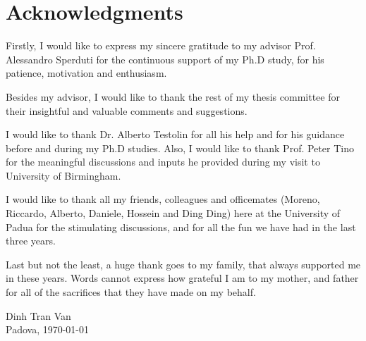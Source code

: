 \chapter*{Acknowledgments}
Firstly, I would like to express my sincere gratitude to my advisor Prof. Alessandro Sperduti for the continuous support of my Ph.D study, for his patience, motivation and enthusiasm.


Besides my advisor, I would like to thank the rest of my thesis committee for their insightful and valuable comments and suggestions.


I would like to thank Dr. Alberto Testolin for all his help and for his guidance before and during my Ph.D studies.  Also, I would like to thank Prof. Peter Tino for the meaningful discussions and inputs he provided during my visit to University of Birmingham.


I would like to thank all my friends, colleagues and officemates (Moreno, Riccardo, Alberto, Daniele, Hossein and Ding Ding) here at the University of Padua for the stimulating discussions, and for all the fun we have had in the last three years.


Last but not the least, a huge thank goes to my family, that always supported me in these years. Words cannot express how grateful I am to my mother, and father for all of the sacrifices that they have made on my behalf.
\vspace{2cm}
\begin{flushright}
Dinh Tran Van~~~~~\\
Padova, \today ~~~~~
\end{flushright}